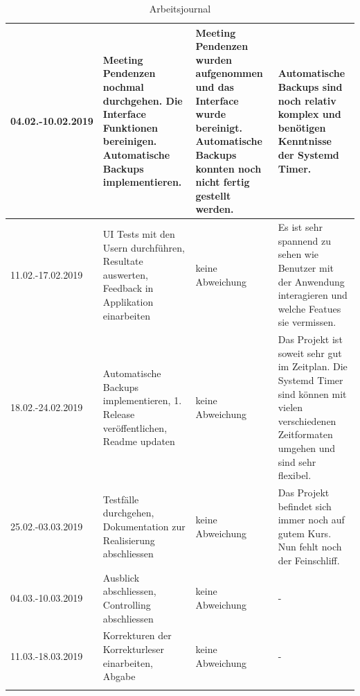 \begin{landscape}
\begin{longtable}{|p{2cm}|p{5cm}|p{5cm}|p{7cm}|}
\hline
04.02.-10.02.2019 & Meeting Pendenzen nochmal durchgehen. Die Interface Funktionen bereinigen. Automatische Backups implementieren. & Meeting Pendenzen wurden aufgenommen und das Interface wurde bereinigt. Automatische Backups konnten noch nicht fertig gestellt werden. & Automatische Backups sind noch relativ komplex und benötigen Kenntnisse der Systemd Timer.\\
\hline
11.02.-17.02.2019 & UI Tests mit den Usern durchführen, Resultate auswerten, Feedback in Applikation einarbeiten & keine Abweichung & Es ist sehr spannend zu sehen wie Benutzer mit der Anwendung interagieren und welche Featues sie vermissen.\\
\hline
18.02.-24.02.2019 & Automatische Backups implementieren, 1. Release veröffentlichen, Readme updaten & keine Abweichung & Das Projekt ist soweit sehr gut im Zeitplan. Die Systemd Timer sind können mit vielen verschiedenen Zeitformaten umgehen und sind sehr flexibel.\\
\hline
25.02.-03.03.2019 & Testfälle durchgehen, Dokumentation zur Realisierung abschliessen & keine Abweichung & Das Projekt befindet sich immer noch auf gutem Kurs. Nun fehlt noch der Feinschliff.\\
\hline
04.03.-10.03.2019 & Ausblick abschliessen, Controlling abschliessen & keine Abweichung & -\\
\hline
11.03.-18.03.2019 & Korrekturen der Korrekturleser einarbeiten, Abgabe & keine Abweichung & -\\
\hline
\caption{\label{tab:orgc3ff16c}
Arbeitsjournal}
\\
\end{longtable}
\end{landscape}

